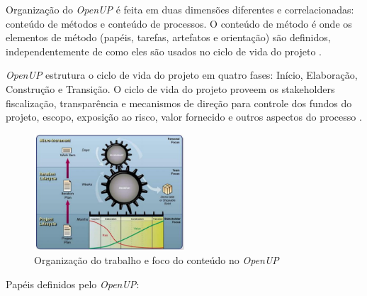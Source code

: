 \documentclass{acm_proc_article-sp}
\begin{document}
Organização do \textit{OpenUP} é feita em  duas dimensões diferentes e correlacionadas: conteúdo de métodos e conteúdo de processos. O conteúdo de método é onde os elementos de método (papéis, tarefas, artefatos e orientação) são definidos, independentemente de como eles são usados no ciclo de vida do projeto \cite{openUP:agil}.

\textit{OpenUP} estrutura o ciclo de vida do projeto em quatro fases: Início, Elaboração, Construção e Transição. O ciclo de vida do projeto proveem os stakeholders fiscalização, transparência e mecanismos de direção para controle dos fundos do projeto, escopo, exposição ao risco, valor fornecido e outros aspectos do processo \cite{openUP:agil}.

\begin{figure}[h]
\centering %
\includegraphics[width=0.5\textwidth]{organizacaoTrabOpenUP.JPG} %
\caption{Organização do trabalho e foco do conteúdo no \textit{OpenUP} \cite{openUP:agil}}
\end{figure}

Papéis definidos pelo \textit{OpenUP}:
\end{document}
